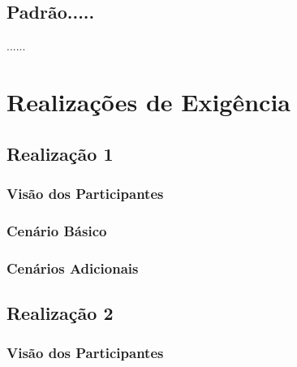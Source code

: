 \documentclass[11pt, a4paper]{article}
\begin{document}
		\subsection{Padrão.....}		
		    ......

		
	\section{Realizações de Exigência}
        
        \subsection{Realização 1}
		
	        \subsubsection{Visão dos Participantes}
		
	        \subsubsection{Cenário Básico}
					
	        \subsubsection{Cenários Adicionais}
                
        \subsection{Realização 2}
		
	        \subsubsection{Visão dos Participantes}
		
\end{document}
